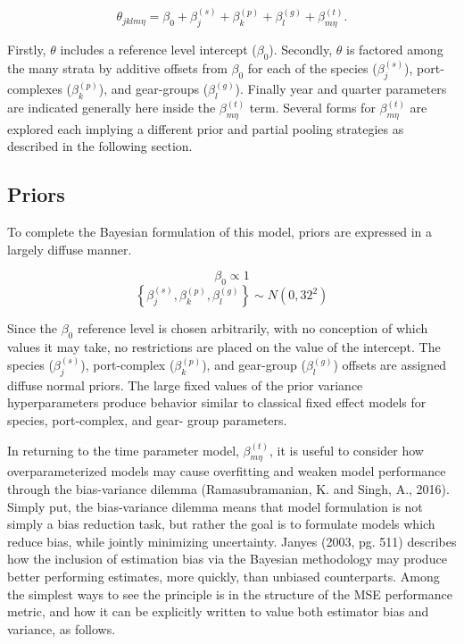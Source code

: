 \documentclass[12pt]{article}
\begin{document}
\[\theta_{jklm\eta} = \beta_0 + \beta^{(s)}_j + \beta^{(p)}_k + \beta^{(g)}_l + \beta^{(t)}_{m\eta}.\]

Firstly, \(\theta\) includes a reference level intercept (\(\beta_0\)).
Secondly, \(\theta\) is factored among the many strata by additive
offsets from \(\beta_0\) for each of the species (\(\beta^{(s)}_j\)),
port-complexes (\(\beta^{(p)}_k\)), and gear-groups (\(\beta^{(g)}_l\)).
Finally year and quarter parameters are indicated generally here inside
the \(\beta^{(t)}_{m\eta}\) term. Several forms for
\(\beta^{(t)}_{m\eta}\) are explored each implying a different prior and
partial pooling strategies as described in the following
section. %

\subsection{Priors}\label{priors}

To complete the Bayesian formulation of this model, priors are expressed
in a largely diffuse manner.

\[\beta_0 \propto 1\]
\[\left\{\beta^{(s)}_j, \beta^{(p)}_k, \beta^{(g)}_l\right\} \sim N(0, 32^2)\]

Since the \(\beta_0\) reference level is chosen arbitrarily, with no
conception of which values it may take, no restrictions are placed on
the value of the intercept. The species (\(\beta^{(s)}_j\)),
port-complex (\(\beta^{(p)}_k\)), and gear-group (\(\beta^{(g)}_l\))
offsets are assigned diffuse normal priors. The large fixed values of
the prior variance hyperparameters produce behavior similar to classical
fixed effect models for species, port-complex, and gear- group
parameters.

In returning to the time parameter model, \(\beta^{(t)}_{m\eta}\), it is
useful to consider how overparameterized models may cause overfitting
and weaken model performance through the bias-variance dilemma
(Ramasubramanian, K. and Singh, A., 2016). Simply put, the bias-variance
dilemma means that model formulation is not simply a bias reduction
task, but rather the goal is to formulate models which reduce bias,
while jointly minimizing uncertainty. Janyes (2003, pg. 511) describes
how the inclusion of estimation bias via the Bayesian methodology may
produce better performing estimates, more quickly, than unbiased
counterparts. Among the simplest ways to see the principle is in the
structure of the MSE performance metric, and how it can be explicitly
written to value both estimator bias and variance, as follows.
\end{document}
